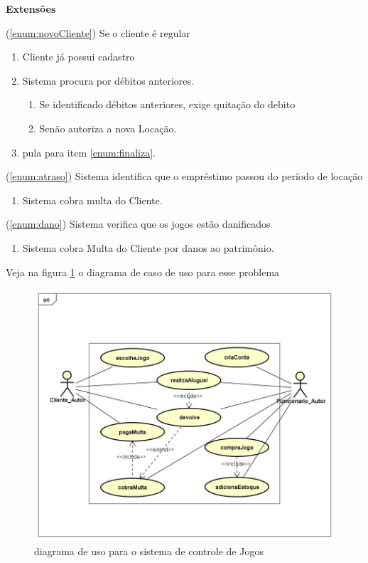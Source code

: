 \documentclass[a4paper,10pt]{article}
\begin{document}
\textbf{Extensões}

(\ref{enum:novoCliente}) Se o cliente é regular
	\begin{enumerate}
		\item Cliente já possui cadastro
		\item Sistema procura por débitos anteriores.
			\begin{enumerate}
				\item Se identificado débitos anteriores, exige quitação do debito
				\item Senão autoriza a nova Locação.
			\end{enumerate}
			\item pula para item \ref{enum:finaliza}.
	\end{enumerate}
	
(\ref{enum:atraso}) Sistema identifica que o empréstimo passou do período de locação
\begin{enumerate}
	\item Sistema cobra multa do Cliente.
\end{enumerate}

(\ref{enum:dano}) Sistema verifica que os jogos estão danificados
\begin{enumerate}
	\item Sistema cobra Multa do Cliente por danos ao patrimônio.
\end{enumerate}

Veja na figura \ref{fig:Jogo:casoDeUso} o diagrama de caso de uso para esse problema

\begin{figure}%
\center
\includegraphics[width=.7\columnwidth]{SistemaDeControleDeLocadoraDeJogos/UML/UseCaseDiagram.jpg}%
\caption{diagrama de uso para o sistema de controle de Jogos}%
\label{fig:Jogo:casoDeUso}%
\end{figure}
\end{document}
